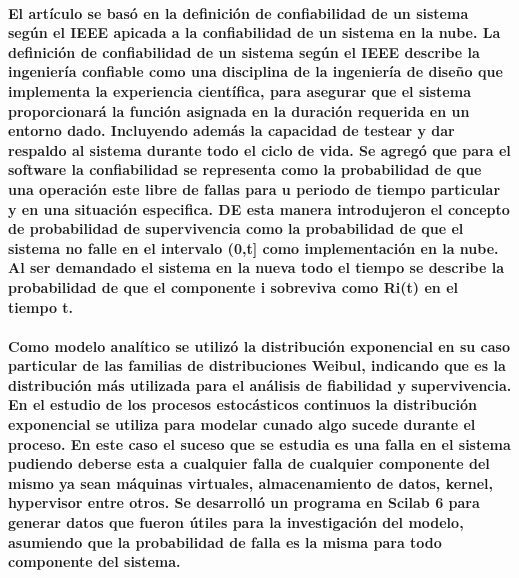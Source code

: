 \paragraph{
    El artículo  se basó en la definición de confiabilidad de un sistema según el IEEE apicada a la confiabilidad de un sistema en la nube. La definición de confiabilidad de un sistema según el IEEE describe la ingeniería confiable como una disciplina de la ingeniería de diseño que implementa la experiencia científica, para asegurar que el sistema proporcionará la función asignada en la duración requerida en un entorno dado. Incluyendo además la capacidad de testear y dar respaldo al sistema durante todo el ciclo de vida. Se agregó que para el software la confiabilidad se representa como la probabilidad de que una operación este libre de fallas para u periodo de tiempo particular y en una situación especifica.
    DE esta manera introdujeron el concepto de probabilidad de supervivencia como la probabilidad de que el sistema no falle en el intervalo (0,t]  como implementación en la nube. Al ser demandado el sistema en la nueva todo el tiempo se describe la probabilidad de que el componente i sobreviva como Ri(t) en el tiempo t.
}

\paragraph{
    Como modelo analítico se utilizó la distribución exponencial en su caso particular de las familias de distribuciones Weibul, indicando que es la distribución más utilizada para el análisis de fiabilidad y supervivencia. En el estudio de los procesos estocásticos continuos la distribución exponencial se utiliza para modelar cunado algo sucede durante el proceso. En este caso el suceso que se estudia es una falla en el sistema pudiendo deberse esta a cualquier falla de cualquier componente del mismo ya sean máquinas virtuales, almacenamiento de datos, kernel, hypervisor entre otros.
    Se desarrolló un programa en Scilab 6 para generar datos que fueron útiles para la investigación del modelo, asumiendo que la probabilidad de falla es la misma para todo componente del sistema.
}

